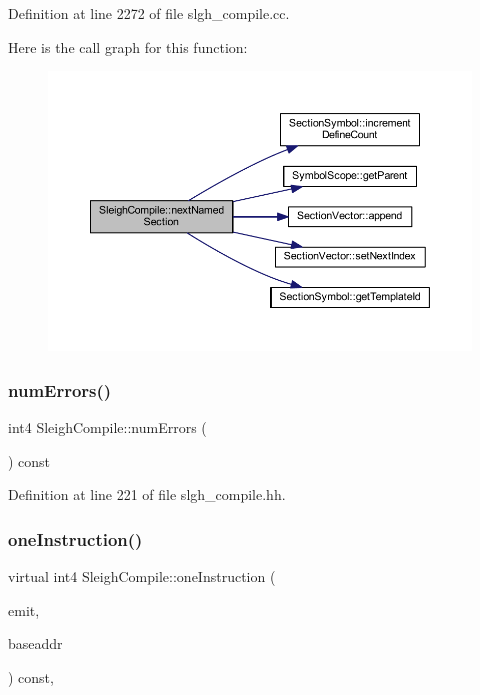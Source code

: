 Definition at line 2272 of file slgh\+\_\+compile.\+cc.

Here is the call graph for this function\+:
\nopagebreak
\begin{figure}[H]
\begin{center}
\leavevmode
\includegraphics[width=350pt]{class_sleigh_compile_aa13d1d257844710ebb377e734e1ca6e6_cgraph}
\end{center}
\end{figure}
\mbox{\label{class_sleigh_compile_a5d784f8080b11074ee3eb7be024a4acb}} 
\subsubsection{\texorpdfstring{numErrors()}{numErrors()}}
{\footnotesize\ttfamily int4 Sleigh\+Compile\+::num\+Errors (\begin{DoxyParamCaption}\item[{void}]{ }\end{DoxyParamCaption}) const\hspace{0.3cm}{\ttfamily [inline]}}



Definition at line 221 of file slgh\+\_\+compile.\+hh.

\mbox{\label{class_sleigh_compile_acdc475de0a5d086c9d256f28c2f6862d}} 
\subsubsection{\texorpdfstring{oneInstruction()}{oneInstruction()}}
{\footnotesize\ttfamily virtual int4 Sleigh\+Compile\+::one\+Instruction (\begin{DoxyParamCaption}\item[{\mbox{\hyperlink{class_pcode_emit}{Pcode\+Emit}} \&}]{emit,  }\item[{const \mbox{\hyperlink{class_address}{Address}} \&}]{baseaddr }\end{DoxyParamCaption}) const\hspace{0.3cm}{\ttfamily [inline]}, {\ttfamily [virtual]}}



